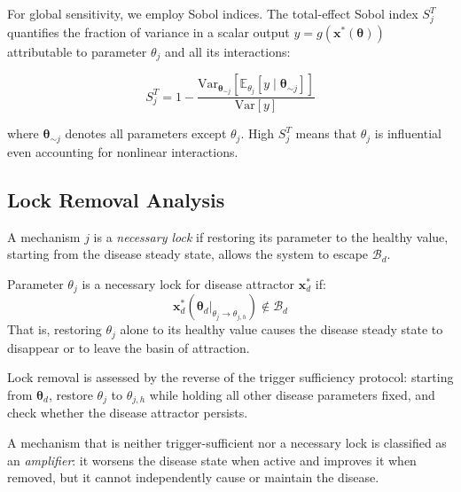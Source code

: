 For global sensitivity, we employ Sobol indices. The total-effect Sobol index $S_j^T$ quantifies the fraction of variance in a scalar output $y = g(\mathbf{x}^*(\boldsymbol{\theta}))$ attributable to parameter $\theta_j$ and all its interactions:

\begin{equation}
\label{eq:sobol-total}
S_j^T = 1 - \frac{\mathrm{Var}_{\boldsymbol{\theta}_{\sim j}}[\mathbb{E}_{\theta_j}[y \mid \boldsymbol{\theta}_{\sim j}]]}{\mathrm{Var}[y]}
\end{equation}

where $\boldsymbol{\theta}_{\sim j}$ denotes all parameters except $\theta_j$. High $S_j^T$ means that $\theta_j$ is influential even accounting for nonlinear interactions.

\subsection{Lock Removal Analysis}
\label{sec:lock-removal-method}

A mechanism $j$ is a \emph{necessary lock} if restoring its parameter to the healthy value, starting from the disease steady state, allows the system to escape $\mathcal{B}_d$.

\begin{definition}
\label{def:lock-necessity}
Parameter $\theta_j$ is a necessary lock for disease attractor $\mathbf{x}_d^*$ if:
\begin{equation}
\label{eq:lock-necessity}
\mathbf{x}_d^*(\boldsymbol{\theta}_d|_{\theta_j \to \theta_{j,h}}) \notin \mathcal{B}_d
\end{equation}
That is, restoring $\theta_j$ alone to its healthy value causes the disease steady state to disappear or to leave the basin of attraction.
\end{definition}

Lock removal is assessed by the reverse of the trigger sufficiency protocol: starting from $\boldsymbol{\theta}_d$, restore $\theta_j$ to $\theta_{j,h}$ while holding all other disease parameters fixed, and check whether the disease attractor persists.

A mechanism that is neither trigger-sufficient nor a necessary lock is classified as an \emph{amplifier}: it worsens the disease state when active and improves it when removed, but it cannot independently cause or maintain the disease.


